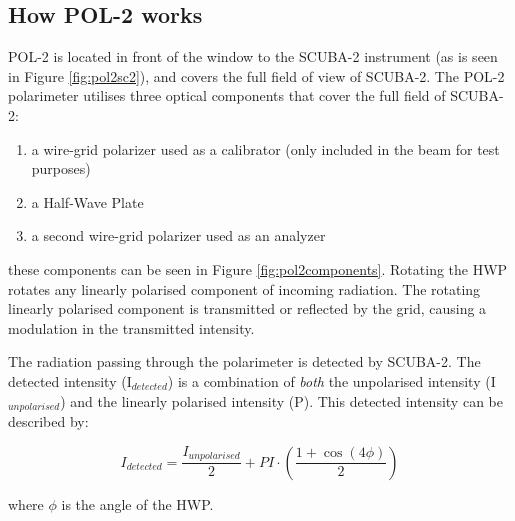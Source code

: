 \subsection*{How POL-2 works}

POL-2 is located in front of the window to the SCUBA-2 instrument
(as is seen in Figure \ref{fig:pol2sc2}), and covers the full
field of view of SCUBA-2. The POL-2 polarimeter
utilises three optical components
that cover the full field of SCUBA-2:

\begin{enumerate}\itemsep-0.2em
\item a wire-grid polarizer used as a calibrator (only included in the
beam for test purposes)
\item a Half-Wave Plate
\item a second wire-grid polarizer used as an analyzer
\end{enumerate}


these components can be seen in Figure \ref{fig:pol2components}.
Rotating the HWP rotates any linearly polarised component of incoming
radiation. The rotating linearly polarised component is
transmitted or reflected by the grid, causing a modulation in the transmitted
intensity.

The radiation passing through the polarimeter is detected by
SCUBA-2. The detected intensity (I$_{detected}$) is a
combination of \emph{both} the unpolarised intensity (I$_{unpolarised}$)
and the linearly polarised intensity (P). This detected intensity can be
described by:


\begin{equation}
I_{detected} = \frac{I_{unpolarised}}{2}+ PI\cdot\left(\frac{1+\cos(4\phi)}{2} \right)
\end{equation}

where $\phi$ is the angle of the HWP.

